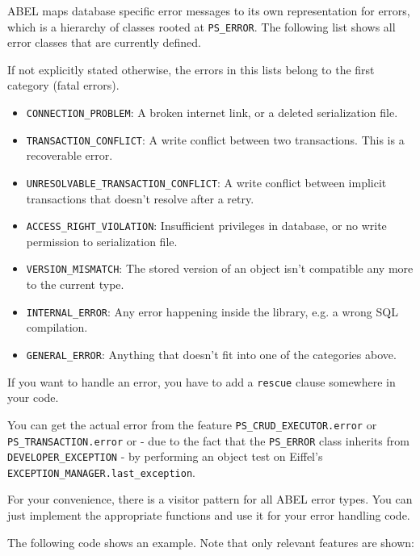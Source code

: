 \documentclass[a4paper,12pt]{report}
\begin{document}
ABEL maps database specific error messages to its own representation for errors, which is a hierarchy of classes rooted at \lstinline!PS_ERROR!.
The following list shows all error classes that are currently defined.

If not explicitly stated otherwise, the errors in this lists belong to the first category (fatal errors).

\begin{itemize}
\item \lstinline!CONNECTION_PROBLEM!: A broken internet link, or a deleted serialization file.
\item \lstinline!TRANSACTION_CONFLICT!: A write conflict between two transactions. This is a recoverable error.
\item \lstinline!UNRESOLVABLE_TRANSACTION_CONFLICT!: A write conflict between implicit transactions that doesn't resolve after a retry.
\item \lstinline!ACCESS_RIGHT_VIOLATION!: Insufficient privileges in database, or no write permission to serialization file.
\item \lstinline!VERSION_MISMATCH!: The stored version of an object isn't compatible any more to the current type.
\item \lstinline!INTERNAL_ERROR!: Any error happening inside the library, e.g. a wrong SQL compilation.
\item \lstinline!GENERAL_ERROR!: Anything that doesn't fit into one of the categories above.
\end{itemize}

If you want to handle an error, you have to add a \lstinline{rescue} clause somewhere in your code.

You can get the actual error from the feature \lstinline!PS_CRUD_EXECUTOR.error! or \lstinline!PS_TRANSACTION.error! or - due to the fact that the \lstinline!PS_ERROR! class inherits from \lstinline!DEVELOPER_EXCEPTION! -
by performing an object test on Eiffel's \lstinline!EXCEPTION_MANAGER.last_exception!.

For your convenience, there is a visitor pattern for all ABEL error types. 
You can just implement the appropriate functions and use it for your error handling code.

The following code shows an example. 
Note that only relevant features are shown:
\end{document}
